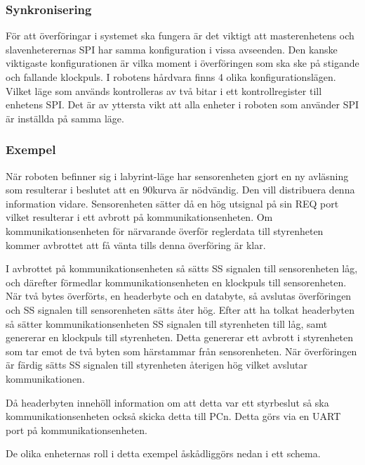 \subsubsection{Synkronisering}
För att överföringar i systemet ska fungera är det viktigt att masterenhetens och slavenheterernas SPI har samma konfiguration i vissa avseenden. Den kanske viktigaste konfigurationen är vilka moment i överföringen som ska ske på stigande och fallande klockpuls. I robotens hårdvara finns 4 olika konfigurationslägen. Vilket läge som används kontrolleras av två bitar i ett kontrollregister till enhetens SPI. Det är av yttersta vikt att alla enheter i roboten som använder SPI är inställda på samma läge.

\subsubsection{Exempel}

När roboten befinner sig i labyrint-läge har sensorenheten gjort en ny avläsning som resulterar i beslutet att en 90\degree kurva är nödvändig. Den vill distribuera denna information vidare. Sensorenheten sätter då en hög utsignal på sin REQ port vilket resulterar i ett avbrott på kommunikationsenheten. Om kommunikationsenheten för närvarande överför reglerdata till styrenheten kommer avbrottet att få vänta tills denna överföring är klar.

I avbrottet på kommunikationsenheten så sätts SS signalen till sensorenheten låg, och därefter förmedlar kommunikationsenheten en klockpuls till sensorenheten. När två bytes överförts, en headerbyte och en databyte, så avslutas överföringen och SS signalen till sensorenheten sätts åter hög. Efter att ha tolkat headerbyten så sätter kommunikationsenheten SS signalen till styrenheten till låg, samt genererar en klockpuls till styrenheten. Detta genererar ett avbrott i styrenheten som tar emot de två byten som härstammar från sensorenheten. När överföringen är färdig sätts SS signalen till styrenheten återigen hög vilket avslutar kommunikationen. 

Då headerbyten innehöll information om att detta var ett styrbeslut så ska kommunikationsenheten också skicka detta till PCn. Detta görs via en UART port på kommunikationsenheten.

De olika enheternas roll i detta exempel åskådliggörs nedan i ett schema.

